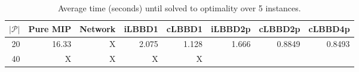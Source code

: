 \begin{table*}
    \centering
    \caption{Average time (seconds) until solved to optimality over 5 instances.}
    \begin{tabular}{rrrrrrrr} \toprule
        $|\mathcal{P}|$ & Pure MIP & Network & iLBBD1 & cLBBD1 & iLBBD2p & cLBBD2p & cLBBD4p \\ \midrule
        20              & 16.33    & X    &   2.075       & 1.128 & 1.666 & 0.8849 & 0.8493 \\
        40              & X   & X     &   X       & X \\
        \bottomrule
    \end{tabular}
\end{table*}
